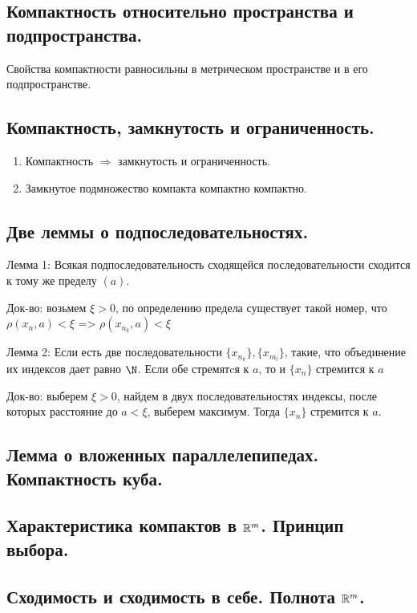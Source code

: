 \documentclass[12pt, a4paper]{article}
\begin{document}
\subsection{Компактность относительно пространства и подпространства.}

Свойства компактности равносильны 
в метрическом пространстве и в его подпространстве.


\subsection{Компактность, замкнутость и ограниченность.}

\begin{enumerate}
    \item Компактность $\Rightarrow$ замкнутость и ограниченность.
    \item Замкнутое подмножество компакта компактно компактно.
\end{enumerate}


\subsection{Две леммы о подпоследовательностях.}

Лемма 1: Всякая подпоследовательность сходящейся последовательности сходится к тому же пределу $(a)$.

Док-во: возьмем $\xi > 0$, по определению предела существует такой номер, что $\rho(x_n, a) < \xi$ =>  $\rho(x_n_k, a) < \xi$

Лемма 2: Если есть две последовательности $\{x_n_k\}, \{x_m_l\}$, такие, что объединение их индексов дает равно $\N$. Если обе стремятcя к $a$, то и $\{x_n\}$ стремится к $a$

Док-во: выберем $\xi > 0$, найдем в двух последовательностях индексы, после которых расстояние до $a < \xi$, выберем максимум. Тогда $\{x_n\}$ стремится к $a$.

\subsection{Лемма о вложенных параллелепипедах. Компактность куба.}

\subsection{Характеристика компактов в ${\mathbb{R}}^m$. Принцип выбора.}

\subsection{Сходимость и сходимость в себе. Полнота ${\mathbb{R}}^m$.}
\end{document}
